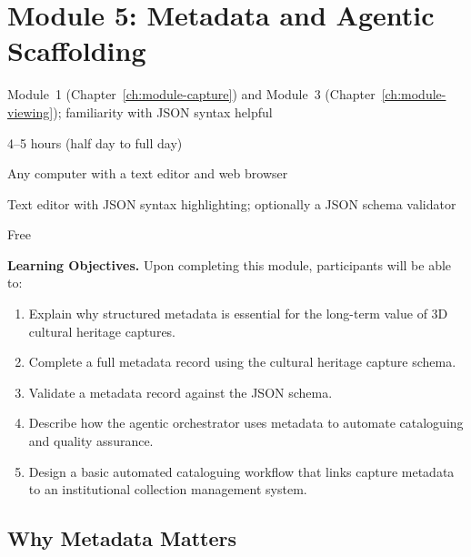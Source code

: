 \chapter{Module 5: Metadata and Agentic Scaffolding}
\label{ch:module-metadata}

\begin{tcolorbox}[
  enhanced,
  colback=LightGrey,
  colframe=MidGrey,
  fonttitle=\bfseries\sffamily,
  title={Module Information},
  sharp corners=south,
  boxrule=0.6pt
]
\begin{description}[font=\sffamily\bfseries, leftmargin=4cm, style=sameline]
  \item[Prerequisites] Module~1 (Chapter~\ref{ch:module-capture}) and Module~3 (Chapter~\ref{ch:module-viewing}); familiarity with JSON syntax helpful
  \item[Duration] 4--5 hours (half day to full day)
  \item[Hardware] Any computer with a text editor and web browser
  \item[Software] Text editor with JSON syntax highlighting; optionally a JSON schema validator
  \item[Budget tier] Free
\end{description}
\end{tcolorbox}

\medskip

\noindent\textbf{Learning Objectives.} Upon completing this module, participants will be able to:
\begin{enumerate}
  \item Explain why structured metadata is essential for the long-term value of 3D cultural heritage captures.
  \item Complete a full metadata record using the cultural heritage capture schema.
  \item Validate a metadata record against the JSON schema.
  \item Describe how the agentic orchestrator uses metadata to automate cataloguing and quality assurance.
  \item Design a basic automated cataloguing workflow that links capture metadata to an institutional collection management system.
\end{enumerate}

\section{Why Metadata Matters}
\label{sec:meta-why}


